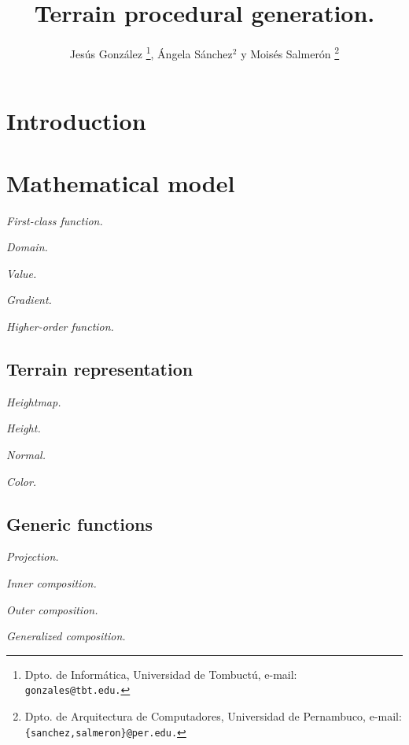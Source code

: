 \documentclass[twocolumn,twoside]{Jornadas}
\begin{document}
\title{Terrain procedural generation.}

\author{%
     Jesús González%
     \thanks{Dpto. de Informática, Universidad de Tombuctú, e-mail: {\tt gonzales@tbt.edu.}},
     Ángela Sánchez$^2$ y Moisés Salmerón%
     \thanks{Dpto. de Arquitectura de Computadores, Universidad de Pernambuco, 
     e-mail: {\tt \{sanchez,salmeron\}@per.edu.}}
}

\maketitle
\markboth{}{}
\pagestyle{empty} 
\thispagestyle{empty} %

\section{Introduction}

\section{Mathematical model}

\textit{First-class function.}

\textit{Domain.}

\textit{Value.}

\textit{Gradient.}

\textit{Higher-order function.}

\subsection{Terrain representation}

\textit{Heightmap.}

\textit{Height.}

\textit{Normal.}

\textit{Color.}

\subsection{Generic functions}

\textit{Projection.}

\textit{Inner composition.}

\textit{Outer composition.}

\textit{Generalized composition.}
\end{document}
